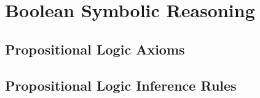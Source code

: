 
\section{Boolean Symbolic Reasoning}


\subsection{Propositional Logic Axioms}

\subsection{Propositional Logic Inference Rules}
